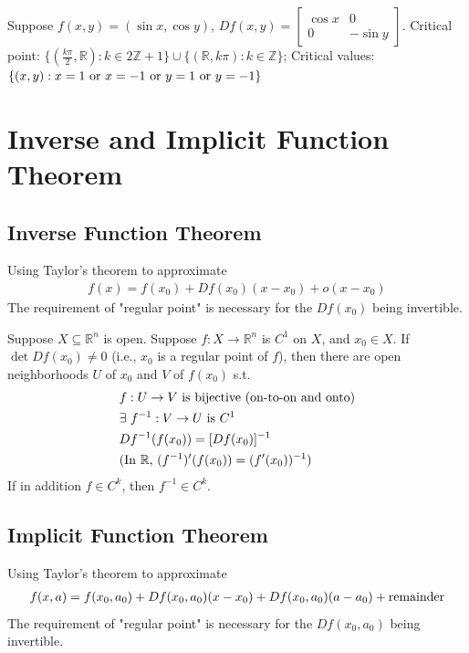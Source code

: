 \documentclass[11pt]{elegantbook}
\begin{document}
\begin{example}
    Suppose $f(x,y)=(\sin x,\cos y)$, $Df(x,y)=\begin{bmatrix}
        \cos x&	0\\
        0&	-\sin y
    \end{bmatrix}$. Critical point: $\{(\frac{k\pi}{2}, \mathbb{R}): k\in 2\mathbb{Z}+1\}\cup\{(\mathbb{R},k\pi): k\in \mathbb{Z}\}$; Critical values: $\{(x,y): x=1\textnormal{ or }x=-1 \textnormal{ or }y=1\textnormal{ or }y=-1\}$
\end{example}


\section{Inverse and Implicit Function Theorem}
\subsection{Inverse Function Theorem}
Using Taylor's theorem to approximate
\begin{equation}
    \begin{aligned}
        f(x)=f(x_0)+Df(x_0)(x-x_0)+o(x-x_0)
    \end{aligned}
    \nonumber
\end{equation}
The requirement of "regular point" is necessary for the $Df(x_0)$ being invertible.
\begin{theorem}
    Suppose $X \subseteq \mathbb{R}^n$ is open. Suppose $f : X \rightarrow \mathbb{R}^n$ is $C^1$ on $X$, and $x_0\in X$. If $\det Df(x_0)\neq 0$ (i.e., $x_0$ is a regular point of $f$), then there are open neighborhoods $U$ of $x_0$ and $V$ of $f(x_0)$ s.t.
    \begin{equation}
        \begin{aligned}
            &f:U \rightarrow V \textnormal{ is bijective (on-to-on and onto)}\\
            &\exists\ f^{-1}:V \rightarrow U \textnormal{ is }C^1\\
            &Df^{-1}(f(x_0))=[Df(x_0)]^{-1}\\
            &\textnormal{(In $\mathbb{R}$, $(f^{-1})'(f(x_0))=(f'(x_0))^{-1}$)}
        \end{aligned}
        \nonumber
    \end{equation}
    If in addition $f \in C^k$, then $f^{-1} \in C^k$.
\end{theorem}

\subsection{Implicit Function Theorem}
Using Taylor's theorem to approximate
\begin{equation}
    \begin{aligned}
        f(x,a)=f(x_0,a_0)+Df(x_0,a_0)(x-x_0)+Df(x_0,a_0)(a-a_0)+\textnormal{remainder}
    \end{aligned}
    \nonumber
\end{equation}
The requirement of "regular point" is necessary for the $Df(x_0,a_0)$ being invertible.
\end{document}
